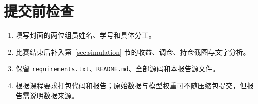 \documentclass[UTF8,a4paper,11pt]{ctexart}
\begin{document}
\section{提交前检查}

\begin{enumerate}
  \item 填写封面的两位组员姓名、学号和具体分工。
  \item 比赛结束后补入第~\ref{sec:simulation} 节的收益、调仓、持仓截图与文字分析。
  \item 保留 \texttt{requirements.txt}、\texttt{README.md}、全部源码和本报告源文件。
  \item 根据课程要求打包代码和报告；原始数据与模型权重可不随压缩包提交，但报告需说明数据来源。
\end{enumerate}
\end{document}
